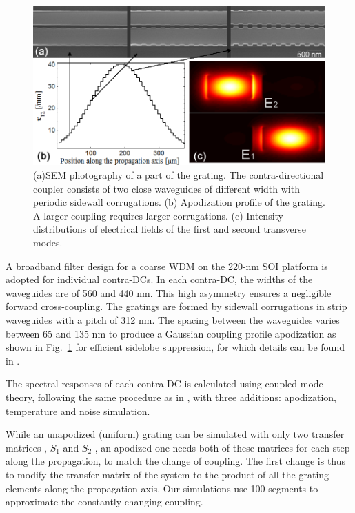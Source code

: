 \documentclass[9pt,twocolumn,twoside]{osajnl}
\begin{document}
\begin{figure}[htbp]
  \centering
  \includegraphics[width=1\columnwidth]{data/FigApod}
  \caption{(a)SEM photography of a part of the grating. The contra-directional coupler consists of two close waveguides of different width with periodic sidewall corrugations. (b) Apodization profile of the grating. A larger coupling requires larger corrugations. (c) Intensity distributions of electrical fields of the first and second transverse modes. }
  \label{fig:SEM}
\end{figure} 


A broadband filter design for a coarse WDM on the 220-nm SOI platform \cite{shi2013siliconCWDM} is adopted for individual contra-DCs.  
In each contra-DC, the widths of the waveguides are of 560 and 440 nm.
This high asymmetry ensures a negligible forward cross-coupling. 
The gratings are formed by sidewall corrugations in strip waveguides with a pitch of 312 nm. 
The spacing between the waveguides varies between 65 and 135 nm to produce a Gaussian coupling profile apodization as shown in Fig.~\ref{fig:SEM} for efficient sidelobe suppression, for which details can be found in \cite{shi2013siliconCWDM}.

The spectral responses of each contra-DC is calculated using coupled mode theory, following the same procedure as in  \cite{shi2013siliconContraDC}, with three additions: apodization, temperature and noise simulation.

While an unapodized (uniform) grating can be simulated with only two transfer matrices , $S_1$ and $S_2$ \cite{shi2013siliconContraDC}, an apodized one needs both of these matrices for each step along the propagation, to match the change of coupling. 
The first change is thus to modify the transfer matrix of the system to the product of all the grating elements along the propagation axis.
Our simulations use 100 segments to approximate the constantly changing coupling.
\end{document}
